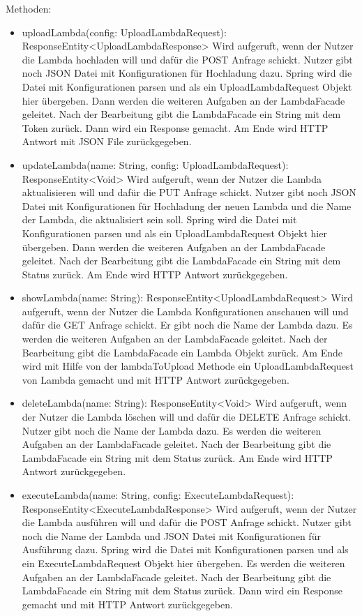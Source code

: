 \documentclass[a4paper,20pt,oneside]{book}
\begin{document}
	Methoden:
	\begin{itemize}
	\item  uploadLambda(config: UploadLambdaRequest): ResponseEntity<UploadLambdaResponse>\linebreak
	Wird aufgeruft, wenn der Nutzer die Lambda hochladen will und dafür die POST Anfrage schickt. Nutzer gibt noch JSON Datei mit Konfigurationen für Hochladung dazu. Spring wird die Datei mit Konfigurationen parsen und als ein UploadLambdaRequest Objekt hier übergeben. Dann werden die weiteren Aufgaben an der LambdaFacade geleitet. Nach der Bearbeitung gibt die LambdaFacade ein String mit dem Token zurück. Dann wird  ein Response gemacht. Am Ende wird HTTP Antwort mit JSON File zurückgegeben.	
	\item updateLambda(name: String, config: UploadLambdaRequest): ResponseEntity<Void> \linebreak
	Wird aufgeruft, wenn der Nutzer die Lambda aktualisieren will und dafür die PUT Anfrage schickt. Nutzer gibt noch JSON Datei mit Konfigurationen für Hochladung der neuen Lambda und die Name der Lambda, die aktualisiert sein soll. Spring wird die Datei mit Konfigurationen parsen und als ein UploadLambdaRequest Objekt hier übergeben. Dann werden die weiteren Aufgaben an der LambdaFacade geleitet. Nach der Bearbeitung gibt die LambdaFacade ein String mit dem Status zurück. Am Ende wird HTTP Antwort zurückgegeben.
	\item showLambda(name: String): ResponseEntity<UploadLambdaRequest>\linebreak
	Wird aufgeruft, wenn der Nutzer die Lambda Konfigurationen anschauen will und dafür die GET Anfrage schickt. Er gibt noch die Name der Lambda dazu. Es werden die weiteren Aufgaben an der LambdaFacade geleitet. Nach der Bearbeitung gibt die LambdaFacade ein Lambda Objekt zurück. Am Ende wird mit Hilfe von der lambdaToUpload Methode ein UploadLambdaRequest von Lambda gemacht und  mit HTTP Antwort zurückgegeben.
	\item deleteLambda(name: String): ResponseEntity<Void>\linebreak
	Wird aufgeruft, wenn der Nutzer die Lambda löschen will und dafür die DELETE Anfrage schickt. Nutzer gibt noch die Name der Lambda dazu. Es werden die weiteren Aufgaben an der LambdaFacade geleitet. Nach der Bearbeitung gibt die LambdaFacade ein String mit dem Status zurück. Am Ende wird HTTP Antwort zurückgegeben.
	\item executeLambda(name: String, config: ExecuteLambdaRequest): ResponseEntity<ExecuteLambdaResponse>\linebreak
	Wird aufgeruft, wenn der Nutzer die Lambda ausführen will und dafür die POST Anfrage schickt. Nutzer gibt noch die Name der Lambda und JSON Datei mit Konfigurationen für Ausführung dazu. Spring wird die Datei mit Konfigurationen parsen und als ein ExecuteLambdaRequest Objekt hier übergeben. Es werden die weiteren Aufgaben an der LambdaFacade geleitet. Nach der Bearbeitung gibt die LambdaFacade ein String mit dem Status zurück. Dann wird ein Response gemacht und mit HTTP Antwort zurückgegeben.	
	

\end{itemize}
\end{document}
